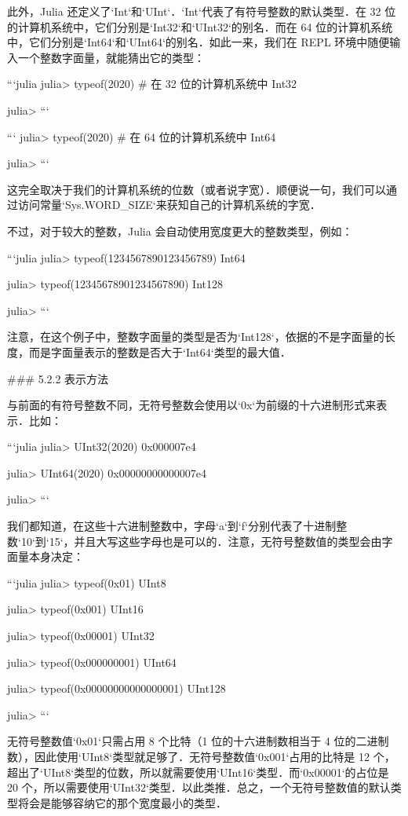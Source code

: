 此外，Julia 还定义了`Int`和`UInt`．`Int`代表了有符号整数的默认类型．在 32 位的计算机系统中，它们分别是`Int32`和`UInt32`的别名．而在 64 位的计算机系统中，它们分别是`Int64`和`UInt64`的别名．如此一来，我们在 REPL 环境中随便输入一个整数字面量，就能猜出它的类型：

```julia
julia> typeof(2020) # 在 32 位的计算机系统中 
Int32 

julia> 
```

```
julia> typeof(2020) # 在 64 位的计算机系统中 
Int64

julia> 
```

这完全取决于我们的计算机系统的位数（或者说字宽）．顺便说一句，我们可以通过访问常量`Sys.WORD_SIZE`来获知自己的计算机系统的字宽．

不过，对于较大的整数，Julia 会自动使用宽度更大的整数类型，例如：

```julia
julia> typeof(1234567890123456789)
Int64

julia> typeof(12345678901234567890)
Int128

julia> 
```

注意，在这个例子中，整数字面量的类型是否为`Int128`，依据的不是字面量的长度，而是字面量表示的整数是否大于`Int64`类型的最大值．

### 5.2.2 表示方法

与前面的有符号整数不同，无符号整数会使用以`0x`为前缀的十六进制形式来表示．比如：

```julia
julia> UInt32(2020)
0x000007e4

julia> UInt64(2020)
0x00000000000007e4

julia> 
```

我们都知道，在这些十六进制整数中，字母`a`到`f`分别代表了十进制整数`10`到`15`，并且大写这些字母也是可以的．注意，无符号整数值的类型会由字面量本身决定：

```julia
julia> typeof(0x01)
UInt8

julia> typeof(0x001)
UInt16

julia> typeof(0x00001)
UInt32

julia> typeof(0x000000001)
UInt64

julia> typeof(0x00000000000000001)
UInt128

julia> 
```

无符号整数值`0x01`只需占用 8 个比特（1 位的十六进制数相当于 4 位的二进制数），因此使用`UInt8`类型就足够了．无符号整数值`0x001`占用的比特是 12 个，超出了`UInt8`类型的位数，所以就需要使用`UInt16`类型．而`0x00001`的占位是 20 个，所以需要使用`UInt32`类型．以此类推．总之，一个无符号整数值的默认类型将会是能够容纳它的那个宽度最小的类型．


